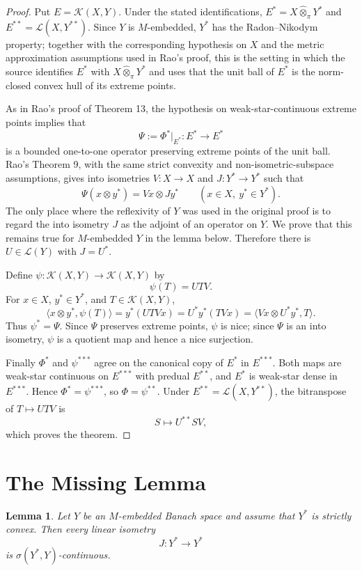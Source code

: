 \documentclass[11pt]{article}
\newtheorem{lemma}{Lemma}
\newcommand{\K}{\mathcal K}
\newcommand{\Lcal}{\mathcal L}
\newcommand{\what}{\widehat{\otimes}}
\begin{document}
\begin{proof}
Put \(E=\K(X,Y)\). Under the stated identifications, \(E^*=X\what_{\pi}Y^*\) and \(E^{**}=\Lcal(X,Y^{**})\). Since \(Y\) is \(M\)-embedded, \(Y^*\) has the Radon--Nikodym property; together with the corresponding hypothesis on \(X\) and the metric approximation assumptions used in Rao's proof, this is the setting in which the source identifies \(E^*\) with \(X\what_{\pi}Y^*\) and uses that the unit ball of \(E^*\) is the norm-closed convex hull of its extreme points.

As in Rao's proof of Theorem 13, the hypothesis on weak-star-continuous extreme points implies that
\[
\Psi:=\Phi^*|_{E^*}:E^*\to E^*
\]
is a bounded one-to-one operator preserving extreme points of the unit ball. Rao's Theorem 9, with the same strict convexity and non-isometric-subspace assumptions, gives into isometries \(V:X\to X\) and \(J:Y^*\to Y^*\) such that
\[
\Psi(x\otimes y^*)=Vx\otimes Jy^*
\qquad(x\in X,\ y^*\in Y^*).
\]
The only place where the reflexivity of \(Y\) was used in the original proof is to regard the into isometry \(J\) as the adjoint of an operator on \(Y\). We prove that this remains true for \(M\)-embedded \(Y\) in the lemma below. Therefore there is \(U\in\Lcal(Y)\) with \(J=U^*\).

Define \(\psi:\K(X,Y)\to\K(X,Y)\) by
\[
\psi(T)=UTV.
\]
For \(x\in X\), \(y^*\in Y^*\), and \(T\in\K(X,Y)\),
\[
\langle x\otimes y^*,\psi(T)\rangle
=y^*(UTVx)
=U^*y^*(TVx)
=\langle Vx\otimes U^*y^*,T\rangle.
\]
Thus \(\psi^*=\Psi\). Since \(\Psi\) preserves extreme points, \(\psi\) is nice; since \(\Psi\) is an into isometry, \(\psi\) is a quotient map and hence a nice surjection.

Finally \(\Phi^*\) and \(\psi^{***}\) agree on the canonical copy of \(E^*\) in \(E^{***}\). Both maps are weak-star continuous on \(E^{***}\) with predual \(E^{**}\), and \(E^*\) is weak-star dense in \(E^{***}\). Hence \(\Phi^*=\psi^{***}\), so \(\Phi=\psi^{**}\). Under \(E^{**}=\Lcal(X,Y^{**})\), the bitranspose of \(T\mapsto UTV\) is
\[
S\mapsto U^{**}SV,
\]
which proves the theorem.
\end{proof}

\section*{The Missing Lemma}

\begin{lemma}
Let \(Y\) be an \(M\)-embedded Banach space and assume that \(Y^*\) is strictly convex. Then every linear isometry
\[
J:Y^*\longrightarrow Y^*
\]
is \(\sigma(Y^*,Y)\)-continuous.
\end{lemma}
\end{document}
